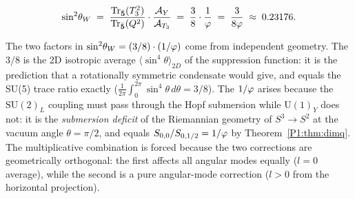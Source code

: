 \begin{corollary}
\label{P1:cor:weinberg_unconditional}
\begin{equation}
  \sin^{2}\!\theta_{W}
  \;=\; \frac{\mathrm{Tr}_{\bar{\mathbf{5}}}(T_3^2)}
             {\mathrm{Tr}_{\bar{\mathbf{5}}}(Q^2)}
        \cdot
        \frac{\mathcal{A}_Y}{\mathcal{A}_{T_3}}
  \;=\; \frac{3}{8}\cdot\frac{1}{\varphi}
  \;=\; \frac{3}{8\varphi}
  \;\approx\; 0.23176.
  \label{P1:eq:weinberg_final}
\end{equation}
\end{corollary}

\begin{remark}
\label{P1:rem:phys_origin}
The two factors in $\sin^{2}\!\theta_{W}=(3/8)\cdot(1/\varphi)$ come from independent
geometry.  The $3/8$ is the 2D isotropic average
$\langle\sin^4\!\theta\rangle_{2D}$ of the suppression function:
it is the prediction that a rotationally symmetric condensate would
give, and equals the SU(5) trace ratio exactly
($\frac{1}{2\pi}\int_0^{2\pi}\sin^4\!\theta\,d\theta = 3/8$).
The $1/\varphi$ arises because the $\mathrm{SU}(2)_L$ coupling must pass
through the Hopf submersion while U$(1)_Y$ does not: it is the
\emph{submersion deficit} of the Riemannian geometry of $S^3\to S^2$
at the vacuum angle $\theta=\pi/2$, and equals $S_{0,0}/S_{0,1/2}=1/\varphi$
by Theorem~\ref{P1:thm:dimq}.
The multiplicative combination is forced because the two corrections
are geometrically orthogonal: the first affects all angular modes
equally ($l=0$ average), while the second is a pure angular-mode
correction ($l>0$ from the horizontal projection).
\end{remark}

